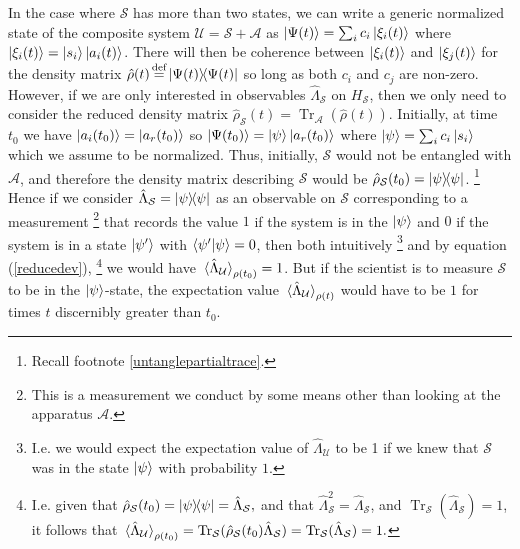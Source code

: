 \documentclass[letter, 12pt]{turabian-thesis}
\theoremstyle{hypothesis}
\newcommand\myeq{\stackrel{\mathclap{\scriptsize\mbox{def}}}{=}}
\let\origfootnote\footnote %
\renewcommand{\footnote}[1]{%
\noindent %
\origfootnote{#1}}
\renewcommand{\Tr}{\operatorname{Tr}}
\begin{document}
In the case where $\mathcal{S}$ has more than two states, we can write a generic normalized state of the composite system $\mathcal{U}=\mathcal{S}+\mathcal{A}$  as $\ket{\Psi(t)}=\sum_i c_i\ket{\xi_i(t)}$  where $\ket{\xi_i(t)}=\ket{s_i}\ket{a_i(t)}$. There will then be coherence between $\ket{\xi_i(t)}$ and $\ket{\xi_j(t)}$ for the density matrix $\hat{\rho}(t)\myeq\dyad{\Psi(t)}$ so long as both $c_i$ and $c_j$ are non-zero. However, if we are only interested in observables $\hat{\Lambda}_\mathcal{S}$ on $H_\mathcal{S}$, then we only need to consider the reduced density matrix $\hat{\rho}_\mathcal{S}(t)=\Tr_\mathcal{A}(\hat{\rho}(t))$. Initially, at time $t_0$ we have $\ket{a_i(t_0)}=\ket{a_r(t_0)}$ so $\ket{\Psi(t_0)}=\ket{\psi}\ket{a_r(t_0)}$ where $\ket{\psi}=\sum_i c_i\ket{s_i}$ which we assume to be normalized. Thus, initially, $\mathcal{S}$ would not be entangled with $\mathcal{A}$, and therefore the density matrix describing $\mathcal{S}$ would be $\hat{\rho}_\mathcal{S}(t_0)=\dyad{\psi}$.\footnote{Recall footnote \ref{untanglepartialtrace}.} Hence if we consider $\hat{\Lambda}_\mathcal{S}=\dyad{\psi}$ as an observable on $\mathcal{S}$ corresponding to a measurement\footnote{This is a measurement we conduct by some means other than looking at the apparatus $\mathcal{A}$.} that records the value $1$ if the system is in the $\ket{\psi}$ and $0$ if the system is in a state $\ket{\psi'}$ with $\ip{\psi'}{\psi}=0$, then both intuitively\footnote{I.e. we would expect the expectation value of $\hat{\Lambda}_\mathcal{U}$ to be 1 if we knew that $\mathcal{S}$ was in the state $\ket{\psi}$ with probability $1$. } and by equation (\ref{reducedev}),\footnote{I.e. given that $\hat{\rho}_\mathcal{S}(t_0)=\dyad{\psi}=\hat{\Lambda}_\mathcal{S},$ and that $\hat{\Lambda}_\mathcal{S}^2= \hat{\Lambda}_\mathcal{S}$, and $\Tr_\mathcal{S}(\hat{\Lambda}_\mathcal{S}) =1$, it follows that $\ev*{\hat{\Lambda}_\mathcal{U}}_{\rho(t_0)}=\Tr_\mathcal{S}(\hat{\rho}_\mathcal{S}(t_0)\hat{\Lambda}_\mathcal{S})= \Tr_\mathcal{S}(\hat{\Lambda}_\mathcal{S})=1.$} we would have $\ev*{\hat{\Lambda}_\mathcal{U}}_{\rho(t_0)}=1$. But if the scientist is to measure $\mathcal{S}$ to be in the $\ket{\psi}$-state, the expectation value $\ev*{\hat{\Lambda}_\mathcal{U}}_{\rho(t)}$ would have to be $1$ for times $t$ discernibly greater than $t_0$. 
\end{document}
